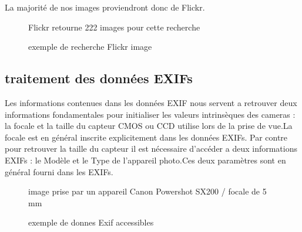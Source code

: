\documentclass[a4paper,10pt,french]{sphinxhowto}
\begin{document}
La majorité de nos images proviendront donc de Flickr.
\begin{figure}[htbp]
\centering
\capstart

\caption{exemple de recherche Flickr image}{\small 
Flickr retourne 222 images pour cette recherche
}\end{figure}


\subsection{\textbf{traitement des données EXIFs}}
\label{collection:traitement-des-donnees-exifs}
Les informations contenues dans les données EXIF nous servent a retrouver deux informations fondamentales pour initialiser les valeurs intrinsèques des cameras : la focale et la taille du capteur CMOS ou CCD utilise lors de la prise de vue.La focale est en général inscrite explicitement dans les données EXIFs. Par contre pour retrouver la taille du capteur il est nécessaire d’accéder a deux informations EXIFs : le Modèle et le Type de l'appareil photo.Ces deux paramètres sont en général fourni dans les EXIFs.
\begin{figure}[htbp]
\centering
\capstart

\caption{exemple de donnes Exif accessibles}{\small 
image prise par un appareil Canon Powershot SX200 / focale de 5 mm
}\end{figure}
\end{document}
